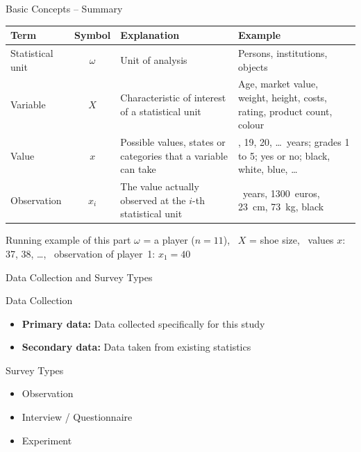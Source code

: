 \documentclass[aspectratio=169,11pt]{beamer}
\begin{document}
\begin{frame}{Basic Concepts -- Summary}
  \begin{center}
    \small
    \renewcommand{\arraystretch}{1.05}
    \begin{tabular}{>{\raggedright\arraybackslash}p{2.6cm}c>{\raggedright\arraybackslash}p{4.4cm}>{\raggedright\arraybackslash}p{5.0cm}}
      \toprule
      \textbf{Term} & \textbf{Symbol} & \textbf{Explanation} & \textbf{Example} \\
      \midrule
      Statistical unit & $\omega$ & Unit of analysis & Persons, institutions, objects \\
      Variable & $X$ & Characteristic of interest of a statistical unit & Age, market value, weight, height, costs, rating, product count, colour \\
      Value & $x$ & Possible values, states or categories that a variable can take & 18, 19, 20, \ldots\ years; grades 1 to 5; yes or no; black, white, blue, \ldots \\
      Observation & $x_i$ & The value actually observed at the $i$-th statistical unit & 31~years, 1300~euros, 23~cm, 73~kg, black \\
      \bottomrule
    \end{tabular}
  \end{center}
  \begin{exampleblock}{Running example of this part}
    $\omega$ = a player ($n = 11$), \ $X$ = shoe size, \ values $x$: 37, 38, \ldots, \
    observation of player~1: $x_1 = 40$
  \end{exampleblock}
\end{frame}

\begin{frame}{Data Collection and Survey Types}
  \begin{block}{Data Collection}
    \begin{itemize}
      \item \textbf{Primary data:} Data collected specifically for this study
      \item \textbf{Secondary data:} Data taken from existing statistics
    \end{itemize}
  \end{block}
  \begin{block}{Survey Types}
    \begin{itemize}
      \item Observation
      \item Interview / Questionnaire
      \item Experiment
    \end{itemize}
  \end{block}
\end{frame}
\end{document}
